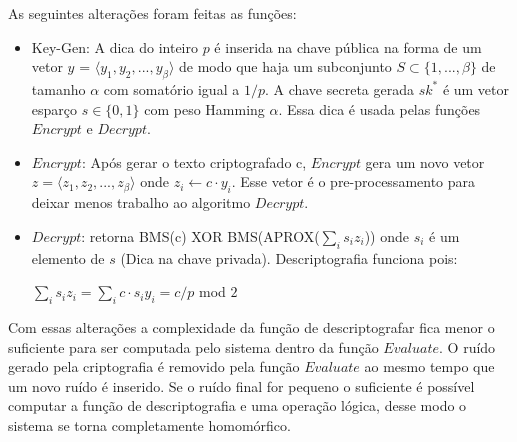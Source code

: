 As seguintes alterações foram feitas as funções:
\begin{itemize}
	\item Key-Gen: A dica do inteiro $p$ é inserida na chave pública na forma de um vetor $y$ = $ \langle y_1, y_2, ..., y_{\beta} \rangle $ de modo que haja um subconjunto  $ S \subset \lbrace 1,...,\beta \rbrace $ de tamanho $ \alpha $ com somatório igual a $1/p$. A chave secreta gerada $sk^{*}$ é um vetor esparço $s \in \lbrace 0,1 \rbrace $ com peso Hamming $ \alpha $. Essa dica é usada pelas funções $Encrypt$ e $Decrypt$.
  	\item $Encrypt$: Após gerar o texto criptografado c, $Encrypt$ gera um novo vetor $z = \langle z_1, z_2, ..., z_{\beta} \rangle $ onde $ z_i \leftarrow c \cdot y_i $. Esse vetor é o pre-processamento para deixar menos trabalho ao algoritmo $Decrypt$.
  	\item $Decrypt$: retorna BMS(c) XOR BMS(APROX($ \sum_{i}^{} s_i z_i $)) onde $s_i$ é um elemento de $s$ (Dica na chave privada). Descriptografia funciona pois: \begin{center} $\sum_{i}^{} s_i z_i = \sum_{i}^{} c \cdot s_i y_i = c/p$ mod $2$ \end{center}	
\end{itemize}

Com essas alterações a complexidade da função de descriptografar fica menor o suficiente para ser computada pelo sistema dentro da função $Evaluate$. O ruído gerado pela criptografia é removido pela função $Evaluate$ ao mesmo tempo que um novo ruído é inserido. Se o ruído final for pequeno o suficiente é possível computar a função de descriptografia e uma operação lógica, desse modo o sistema se torna completamente homomórfico.
